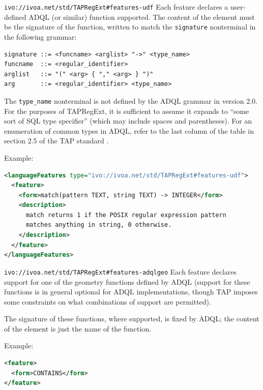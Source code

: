 \documentclass{ivoa}
\begin{document}
\begin{bigdescription}
\item[\nolinkurl{ivo://ivoa.net/std/TAPRegExt\#features-udf}] Each feature declares a user-defined ADQL (or similar) function supported.
    The content of the  element
    must be the signature of the function, written to match the
    \texttt{signature} nonterminal in the following grammar:


\begin{verbatim}
signature ::= <funcname> <arglist> "->" <type_name>
funcname  ::= <regular_identifier>
arglist   ::= "(" <arg> { "," <arg> } ")"
arg       ::= <regular_identifier> <type_name>
\end{verbatim}

The \texttt{type\_name} nonterminal is not defined by the ADQL
		grammar in version 2.0. 
		For the purposes of TAPRegExt, it is sufficient to assume
		it expands to ``some sort of SQL type specifier'' (which may
		include spaces and parentheses).  For an enumeration of common types
		in ADQL, refer to the last column of the table in section 2.5 of 
		the TAP standard \citep{2019ivoa.spec.0927D}.

Example:


\begin{lstlisting}[language=XML,basicstyle=\footnotesize]
<languageFeatures type="ivo://ivoa.net/std/TAPRegExt#features-udf">
  <feature>
    <form>match(pattern TEXT, string TEXT) -> INTEGER</form>
    <description>
      match returns 1 if the POSIX regular expression pattern 
      matches anything in string, 0 otherwise.
    </description>
  </feature>
</languageFeatures>
\end{lstlisting}


\item[\nolinkurl{ivo://ivoa.net/std/TAPRegExt\#features-adqlgeo}] Each feature declares support for one of the geometry functions 
		defined by ADQL
    (support for these functions is in general optional for ADQL
    implementations, though TAP imposes some constraints on what 
    combinations of support are permitted).

The signature of these functions, where supported, is fixed by ADQL;
    the content of the  element
    is just the name of the function.

Example:


\begin{lstlisting}[language=XML,basicstyle=\footnotesize]
<feature>
  <form>CONTAINS</form>
</feature>
\end{lstlisting}



\end{bigdescription}
\end{document}
